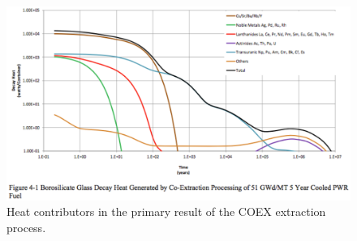 \begin{figure}[htbp!]
  \begin{center}
    \includegraphics[width=0.7\textheight]{carter_coex_heat.eps}
  \end{center}
  \caption{Heat contributors in the primary result of the COEX extraction 
    process\cite{carter_us_2011}.}
  \label{fig:carter_coex_heat}
\end{figure}
